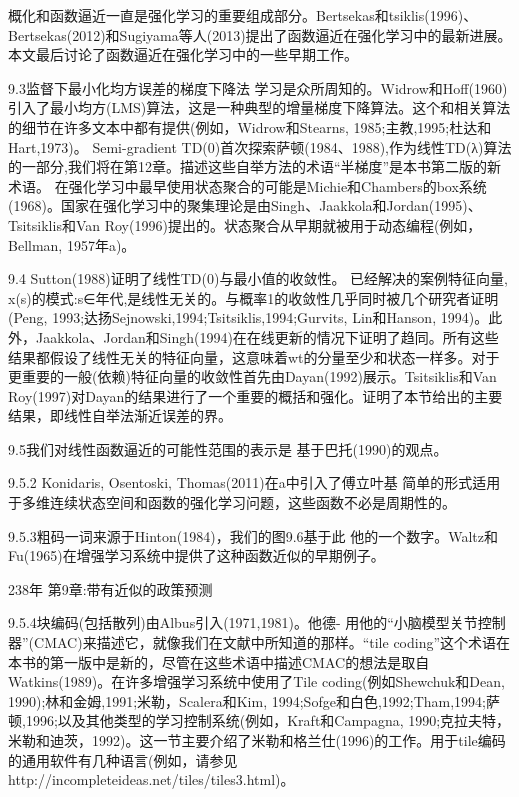 {概化和函数逼近一直是强化学习的重要组成部分。Bertsekas和tsiklis(1996)、Bertsekas(2012)和Sugiyama等人(2013)提出了函数逼近在强化学习中的最新进展。本文最后讨论了函数逼近在强化学习中的一些早期工作。

9.3监督下最小化均方误差的梯度下降法
学习是众所周知的。Widrow和Hoff(1960)引入了最小均方(LMS)算法，这是一种典型的增量梯度下降算法。这个和相关算法的细节在许多文本中都有提供(例如，Widrow和Stearns, 1985;主教,1995;杜达和Hart,1973)。
Semi-gradient TD(0)首次探索萨顿(1984、1988),作为线性TD(λ)算法的一部分,我们将在第12章。描述这些自举方法的术语“半梯度”是本书第二版的新术语。
在强化学习中最早使用状态聚合的可能是Michie和Chambers的box系统(1968)。国家在强化学习中的聚集理论是由Singh、Jaakkola和Jordan(1995)、Tsitsiklis和Van Roy(1996)提出的。状态聚合从早期就被用于动态编程(例如，Bellman, 1957年a)。

9.4 Sutton(1988)证明了线性TD(0)与最小值的收敛性。
已经解决的案例特征向量,{ x(s)的模式:s∈年代},是线性无关的。与概率1的收敛性几乎同时被几个研究者证明(Peng, 1993;达扬Sejnowski,1994;Tsitsiklis,1994;Gurvits, Lin和Hanson, 1994)。此外，Jaakkola、Jordan和Singh(1994)在在线更新的情况下证明了趋同。所有这些结果都假设了线性无关的特征向量，这意味着wt的分量至少和状态一样多。对于更重要的一般(依赖)特征向量的收敛性首先由Dayan(1992)展示。Tsitsiklis和Van Roy(1997)对Dayan的结果进行了一个重要的概括和强化。证明了本节给出的主要结果，即线性自举法渐近误差的界。

9.5我们对线性函数逼近的可能性范围的表示是
基于巴托(1990)的观点。

9.5.2 Konidaris, Osentoski, Thomas(2011)在a中引入了傅立叶基
简单的形式适用于多维连续状态空间和函数的强化学习问题，这些函数不必是周期性的。

9.5.3粗码一词来源于Hinton(1984)，我们的图9.6基于此
他的一个数字。Waltz和Fu(1965)在增强学习系统中提供了这种函数近似的早期例子。

238年 					第9章:带有近似的政策预测



9.5.4块编码(包括散列)由Albus引入(1971,1981)。他德-
用他的“小脑模型关节控制器”(CMAC)来描述它，就像我们在文献中所知道的那样。“tile coding”这个术语在本书的第一版中是新的，尽管在这些术语中描述CMAC的想法是取自Watkins(1989)。在许多增强学习系统中使用了Tile coding(例如Shewchuk和Dean, 1990);林和金姆,1991;米勒，Scalera和Kim, 1994;Sofge和白色,1992;Tham,1994;萨顿,1996;以及其他类型的学习控制系统(例如，Kraft和Campagna, 1990;克拉夫特，米勒和迪茨，1992)。这一节主要介绍了米勒和格兰仕(1996)的工作。用于tile编码的通用软件有几种语言(例如，请参见http://incompleteideas.net/tiles/tiles3.html)。

}
